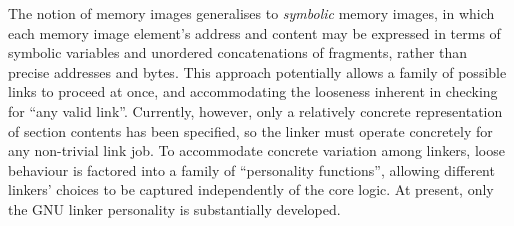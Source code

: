 The notion of memory images generalises to \emph{symbolic} memory images, in which 
each memory image element's address and content may be expressed in terms of 
symbolic variables and unordered concatenations of fragments, rather than precise addresses
and bytes.
This approach potentially allows a family of possible links to proceed at once,
and accommodating the looseness inherent in checking for ``any valid link''.
Currently, however, only a relatively concrete representation of section contents has been specified, 
so the linker must operate concretely for any non-trivial link job.
To accommodate concrete variation among linkers, loose behaviour is factored into 
a family of ``personality functions'', allowing different linkers' choices to be 
captured independently of the core logic. 
At present, only the GNU linker personality is substantially developed.



% 
% 
% 

% 
% 
% 
% 
% 
% 
% 
% 




